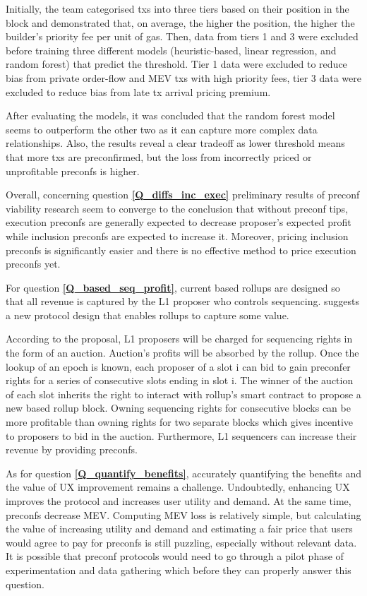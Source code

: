 \documentclass[conference]{IEEEtran}
\theoremstyle{boldstyle}
\begin{document}
    Initially, the team categorised txs into three tiers based on their position in the block and demonstrated that, on average, the higher the position, the higher the builder's priority fee per unit of gas. Then, data from tiers 1 and 3 were excluded before training three different models (heuristic-based, linear regression, and random forest) that predict the threshold. Tier 1 data were excluded to reduce bias from private order-flow and MEV txs with high priority fees, tier 3 data were excluded to reduce bias from late tx arrival pricing premium.

    After evaluating the models, it was concluded that the random forest model seems to outperform the other two as it can capture more complex data relationships. Also, the results reveal a clear tradeoff as lower threshold means that more txs are preconfirmed, but the loss from incorrectly priced or unprofitable preconfs is higher.

    Overall, concerning question \textbf{\ref{Q_diffs_inc_exec}} preliminary results of preconf viability research seem to converge to the conclusion that without preconf tips, execution preconfs are generally expected to decrease proposer's expected profit while inclusion preconfs are expected to increase it. Moreover, pricing inclusion preconfs is significantly easier and there is no effective method to price execution preconfs yet.

    For question \textbf{\ref{Q_based_seq_profit}}, current based rollups are designed so that all revenue is captured by the L1 proposer who controls sequencing. \cite{W:Value-CapturingBasedRollupswithBasedPreconfirmations} suggests a new protocol design that enables rollups to capture some value.

    According to the proposal, L1 proposers will be charged for sequencing rights in the form of an auction. Auction's profits will be absorbed by the rollup. Once the lookup of an epoch is known, each proposer of a slot i can bid to gain preconfer rights for a series of consecutive slots ending in slot i. The winner of the auction of each slot inherits the right to interact with rollup's smart contract to propose a new based rollup block. Owning sequencing rights for consecutive blocks can be more profitable than owning rights for two separate blocks which gives incentive to proposers to bid in the auction. Furthermore, L1 sequencers can increase their revenue by providing preconfs.

    As for question \textbf{\ref{Q_quantify_benefits}}, accurately quantifying the benefits and the value of UX improvement remains a challenge. Undoubtedly, enhancing UX improves the protocol and increases user utility and demand. At the same time, preconfs decrease MEV. Computing MEV loss is relatively simple, but calculating the value of increasing utility and demand and estimating a fair price that users would agree to pay for preconfs is still puzzling, especially without relevant data. It is possible that preconf protocols would need to go through a pilot phase of experimentation and data gathering which before they can properly answer this question.
\end{document}
